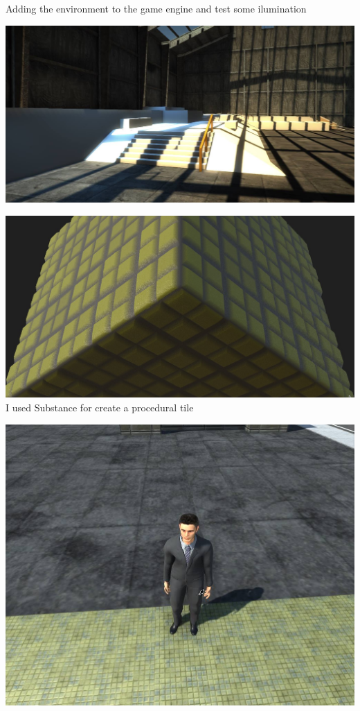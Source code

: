 \documentclass{article}
\begin{document}
  Adding the environment to the game engine and test some ilumination

  \includegraphics[width=\textwidth]{26.jpg}
  
  \includegraphics[width=\textwidth]{39.jpg}
  I used Substance for create a procedural tile
  
  \includegraphics[width=\textwidth]{40.jpg}
  
\end{document}
